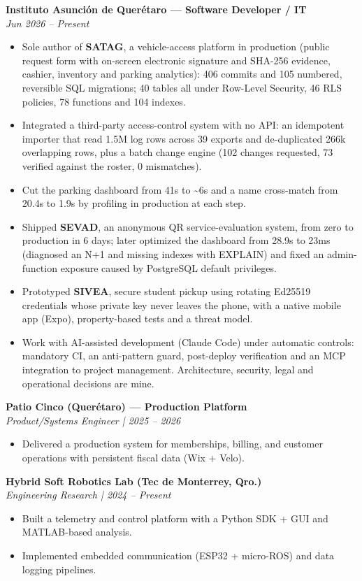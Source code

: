 \documentclass[10pt,letterpaper]{article}
\begin{document}
\textbf{Instituto Asunción de Querétaro — Software Developer / IT}\\
\textit{Jun 2026 -- Present}
\begin{itemize}[leftmargin=*]
  \item Sole author of \textbf{SATAG}, a vehicle-access platform in production (public request form with on-screen electronic signature and SHA-256 evidence, cashier, inventory and parking analytics): 406 commits and 105 numbered, reversible SQL migrations; 40 tables all under Row-Level Security, 46 RLS policies, 78 functions and 104 indexes.
  \item Integrated a third-party access-control system with no API: an idempotent importer that read 1.5M log rows across 39 exports and de-duplicated 266k overlapping rows, plus a batch change engine (102 changes requested, 73 verified against the roster, 0 mismatches).
  \item Cut the parking dashboard from 41s to \textasciitilde6s and a name cross-match from 20.4s to 1.9s by profiling in production at each step.
  \item Shipped \textbf{SEVAD}, an anonymous QR service-evaluation system, from zero to production in 6 days; later optimized the dashboard from 28.9s to 23ms (diagnosed an N+1 and missing indexes with EXPLAIN) and fixed an admin-function exposure caused by PostgreSQL default privileges.
  \item Prototyped \textbf{SIVEA}, secure student pickup using rotating Ed25519 credentials whose private key never leaves the phone, with a native mobile app (Expo), property-based tests and a threat model.
  \item Work with AI-assisted development (Claude Code) under automatic controls: mandatory CI, an anti-pattern guard, post-deploy verification and an MCP integration to project management. Architecture, security, legal and operational decisions are mine.
\end{itemize}

\textbf{Patio Cinco (Querétaro) — Production Platform}\\
\textit{Product/Systems Engineer | 2025 -- 2026}
\begin{itemize}[leftmargin=*]
  \item Delivered a production system for memberships, billing, and customer operations with persistent fiscal data (Wix + Velo).
\end{itemize}

\textbf{Hybrid Soft Robotics Lab (Tec de Monterrey, Qro.)}\\
\textit{Engineering Research | 2024 -- Present}
\begin{itemize}[leftmargin=*]
  \item Built a telemetry and control platform with a Python SDK + GUI and MATLAB-based analysis.
  \item Implemented embedded communication (ESP32 + micro-ROS) and data logging pipelines.
\end{itemize}
\end{document}
